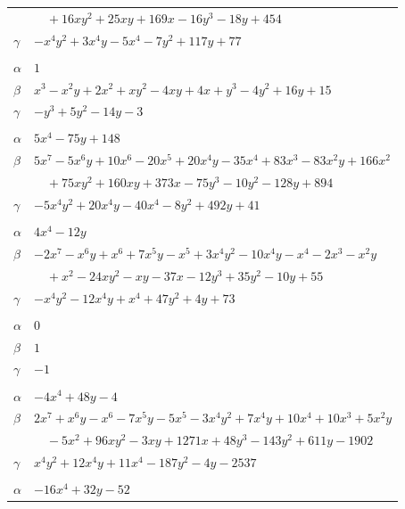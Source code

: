 \documentclass[11pt]{article}
\begin{document}
\begin{longtable}{@{}ll@{}}
 & $\quad +16xy^{2}+25xy+169x-16y^{3}-18y+454$\\
$\gamma$ & $-x^{4}y^{2}+3x^{4}y-5x^{4}-7y^{2}+117y+77$\\
\addlinespace[3pt]
\multicolumn{2}{@{}l}{$\{i,j\}=\{35,37\}$, $k_{ij}=5^{2}$}\\
$\alpha$ & $1$\\
$\beta$ & $x^{3}-x^{2}y+2x^{2}+xy^{2}-4xy+4x+y^{3}-4y^{2}+16y+15$\\
$\gamma$ & $-y^{3}+5y^{2}-14y-3$\\
\addlinespace[3pt]
\multicolumn{2}{@{}l}{$\{i,j\}=\{35,40\}$, $k_{ij}=2^{4}\cdot 11^{2}$}\\
$\alpha$ & $5x^{4}-75y+148$\\
$\beta$ & $5x^{7}-5x^{6}y+10x^{6}-20x^{5}+20x^{4}y-35x^{4}+83x^{3}-83x^{2}y+166x^{2}$\\
 & $\quad +75xy^{2}+160xy+373x-75y^{3}-10y^{2}-128y+894$\\
$\gamma$ & $-5x^{4}y^{2}+20x^{4}y-40x^{4}-8y^{2}+492y+41$\\
\addlinespace[3pt]
\multicolumn{2}{@{}l}{$\{i,j\}=\{36,16\}$, $k_{ij}=2^{7}$}\\
$\alpha$ & $4x^{4}-12y$\\
$\beta$ & $-2x^{7}-x^{6}y+x^{6}+7x^{5}y-x^{5}+3x^{4}y^{2}-10x^{4}y-x^{4}-2x^{3}-x^{2}y$\\
 & $\quad +x^{2}-24xy^{2}-xy-37x-12y^{3}+35y^{2}-10y+55$\\
$\gamma$ & $-x^{4}y^{2}-12x^{4}y+x^{4}+47y^{2}+4y+73$\\
\addlinespace[3pt]
\multicolumn{2}{@{}l}{$\{i,j\}=\{36,38\}$, $k_{ij}=3$}\\
$\alpha$ & $0$\\
$\beta$ & $1$\\
$\gamma$ & $-1$\\
\addlinespace[3pt]
\multicolumn{2}{@{}l}{$\{i,j\}=\{36,43\}$, $k_{ij}=2^{5}\cdot 3^{2}\cdot 11$}\\
$\alpha$ & $-4x^{4}+48y-4$\\
$\beta$ & $2x^{7}+x^{6}y-x^{6}-7x^{5}y-5x^{5}-3x^{4}y^{2}+7x^{4}y+10x^{4}+10x^{3}+5x^{2}y$\\
 & $\quad -5x^{2}+96xy^{2}-3xy+1271x+48y^{3}-143y^{2}+611y-1902$\\
$\gamma$ & $x^{4}y^{2}+12x^{4}y+11x^{4}-187y^{2}-4y-2537$\\
\addlinespace[3pt]
\multicolumn{2}{@{}l}{$\{i,j\}=\{37,18\}$, $k_{ij}=2^{2}\cdot 3^{4}\cdot 5$}\\
$\alpha$ & $-16x^{4}+32y-52$\\

\end{longtable}
\end{document}
